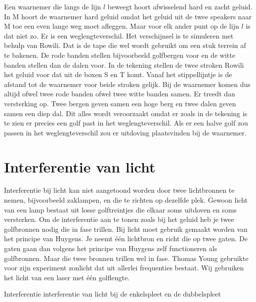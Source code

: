 {Een waarnemer die langs de lijn $l$ beweegt hoort afwisselend hard en zacht geluid. In M hoort de waarnemer hard geluid omdat het geluid uit de twee speakers naar M toe een even lange weg moet afleggen. Maar voor elk ander punt op de lijn $l$ is dat niet zo. Er is een weglengteverschil. Het verschijnsel is te simuleren met behulp van Rowili. Dat is de tape die wel wordt gebruikt om een stuk terrein af te bakenen. De rode banden stellen bijvoorbeeld golfbergen voor en de witte banden stellen dan de dalen voor. In de tekening stellen de twee stroken Rowili het geluid voor dat uit de boxen S en T komt. Vanaf het stippellijntje is de afstand tot de waarnemer voor beide stroken gelijk. Bij de waarnemer komen dus altijd ofwel twee rode banden ofwel twee witte banden samen. Er treedt dan versterking op. Twee bergen geven samen een hoge berg en twee dalen geven samen een diep dal. Dit alles wordt veroorzaakt omdat er zoals in de tekening is te zien er precies een golf past in het weglengteverschil. Als er een halve golf zou passen in het weglengteverschil zou er uitdoving plaatsvinden bij de waarnemer. 

\section{Interferentie van licht} 
Interferentie bij licht kan niet aangetoond worden door twee lichtbronnen te nemen, bijvoorbeeld zaklampen, en die te richten op dezelfde plek. Gewoon licht van een lamp bestaat uit losse golftreintjes die elkaar soms uitdoven en soms versterken. Om de interferentie aan te tonen zoals bij het geluid heb je twee golfbronnen nodig die in fase trillen. Bij licht moet gebruik gemaakt worden van het principe van Huygens. Je neemt \'e\'en lichtbron en richt die op twee gaten. De gaten gaan dan volgens het principe van Huygens zelf functioneren als golfbronnen. Maar die twee bronnen trillen wel in fase. Thomas Young gebruikte voor zijn experiment zonlicht dat uit allerlei frequenties bestaat. Wij gebruiken het licht van een laser met \'e\'en golflengte.

\begin{experiment}{Interferentie}
interferentie van licht bij de enkelspleet en de dubbelspleet
\end{experiment}

}
